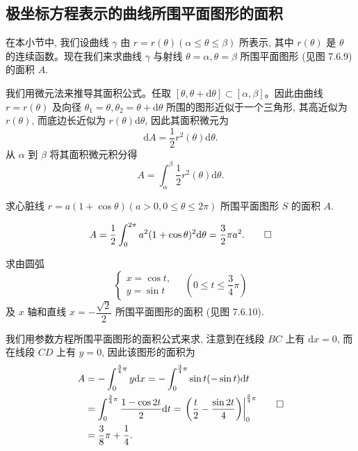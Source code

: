 \subsection{极坐标方程表示的曲线所围平面图形的面积}
\label{subsec:ma-7-6-4}

在本小节中, 我们设曲线 $\gamma$ 由 $r=r(\theta)(\alpha\leq\theta\leq\beta)$ 所表示, 其中 $r(\theta)$ 是 $\theta$ 的连续函数。现在我们来求曲线 $\gamma$ 与射线 $\theta=\alpha,\theta=\beta$ 所围平面图形 (见图 7.6.9) 的面积 $A$.

我们用微元法来推导其面积公式。任取 $[\theta,\theta+\mathrm d\theta]\subset[\alpha,\beta]$。因此由曲线 $r=r(\theta)$ 及向径 $\theta_1=\theta,\theta_2=\theta+\mathrm d\theta$ 所围的图形近似于一个三角形, 其高近似为 $r(\theta)$, 而底边长近似为 $r(\theta)\mathrm d\theta$, 因此其面积微元为
\[
  \mathrm dA=\frac{1}{2}r^2(\theta)\mathrm d\theta.
\]
从 $\alpha$ 到 $\beta$ 将其面积微元积分得
\[
  A=\int_\alpha^\beta\frac{1}{2}r^2(\theta)\mathrm d\theta.
\]

\begin{example}\label{example:ma-7-6-4}
求心脏线 $r=a(1+\cos\theta)(a>0,0\leq\theta\leq2\pi)$ 所围平面图形 $S$ 的面积 $A$.
\end{example}


\begin{solve}
\[
  A=\frac{1}{2}\int_0^{2\pi}a^2(1+\cos\theta)^2\mathrm d\theta=\frac{3}{2}\pi a^2.
\qedhere
\]
\end{solve}


\begin{example}\label{example:ma-7-6-5}
求由圆弧
\[
  \begin{cases}
    x=\cos t,\\
    y=\sin t
  \end{cases}
  \quad\left(0\leq t\leq\frac{3}{4}\pi\right)
\]
及 $x$ 轴和直线 $x=-\dfrac{\sqrt2}{2}$ 所围平面图形的面积 (见图 7.6.10).
\end{example}


\begin{solve}[{解法 1}]
我们用参数方程所围平面图形的面积公式来求, 注意到在线段 $BC$ 上有 $\mathrm dx=0$, 而在线段 $CD$ 上有 $y=0$, 因此该图形的面积为
\[
\begin{aligned}
  A&=-\int_0^{\frac34\pi}y\mathrm dx
  =-\int_0^{\frac34\pi}\sin t(-\sin t)\mathrm dt\\
  &=\int_0^{\frac34\pi}\frac{1-\cos2t}{2}\mathrm dt
  =\left.\left(\frac{t}{2}-\frac{\sin2t}{4}\right)\right|_0^{\frac34\pi}\\
  &=\frac{3}{8}\pi+\frac{1}{4}.
\end{aligned}
\qedhere
\]
\end{solve}


